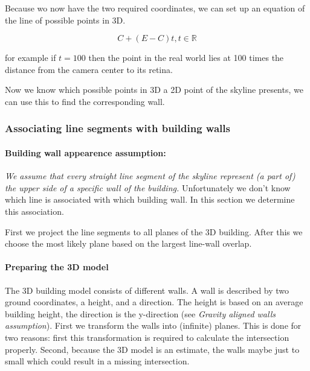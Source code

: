 	Because wo now have the two required coordinates, we can set up an equation of the
	line of possible points in 3D.  

	\[ C + (E-C)t, t \in \mathbb{R} \]

	for example if $t=100$ then the point in the real world lies at 100 times the
		distance from the camera center to its retina.

	Now we know which possible points in 3D a 2D point of the skyline presents,
	we can use this to find the corresponding wall.


\subsubsection{Associating line segments with building walls}
	\paragraph{Building wall appearence assumption:}
	\emph{We assume that every straight line segment of the skyline represent (a part of) the upper side of a specific wall of the building.}
	Unfortunately we don't know which line is associated with which building
	wall. In this section we determine this association.

	First we project the line segments to all planes of the 3D building.  After
	this we choose the most likely plane based on the largest line-wall overlap. 

	\paragraph{Preparing the 3D model}
	The 3D building model consists of different walls. A wall is described by
	two ground coordinates, a height, and a direction.
	The height is based on an average building height, the direction is the
	y-direction (see \emph{Gravity aligned walls assumption}).
	First we transform the walls into (infinite) planes.  This is done for two
	reasons: first this transformation is required to calculate the intersection
	properly. Second, because the 3D model is an estimate, the walls maybe just
	to small which could result in a missing intersection. \\


